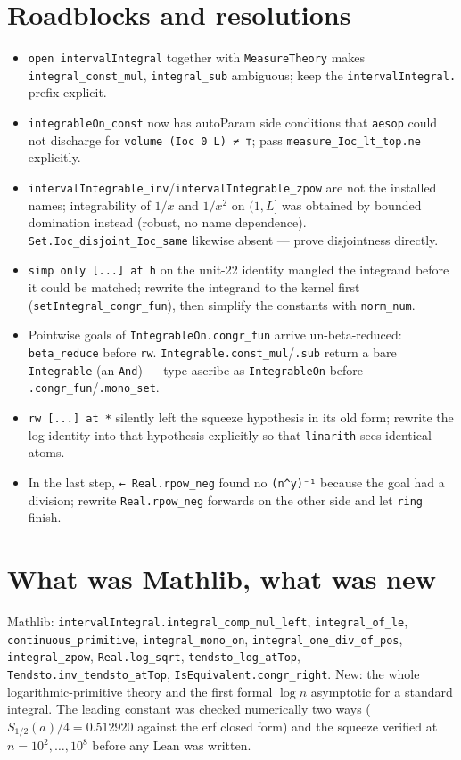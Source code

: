 \documentclass[11pt]{article}
\begin{document}
\section{Roadblocks and resolutions}
\begin{itemize}
\item \texttt{open intervalIntegral} together with \texttt{MeasureTheory} makes
\texttt{integral\_const\_mul}, \texttt{integral\_sub} ambiguous; keep the \texttt{intervalIntegral.}
prefix explicit.
\item \texttt{integrableOn\_const} now has autoParam side conditions that \texttt{aesop} could not
discharge for \texttt{volume (Ioc 0 L) ≠ ⊤}; pass \texttt{measure\_Ioc\_lt\_top.ne} explicitly.
\item \texttt{intervalIntegrable\_inv}/\texttt{intervalIntegrable\_zpow} are not the installed names;
integrability of $1/x$ and $1/x^2$ on $(1,L]$ was obtained by bounded domination instead (robust, no
name dependence). \texttt{Set.Ioc\_disjoint\_Ioc\_same} likewise absent --- prove disjointness directly.
\item \texttt{simp only [...] at h} on the unit-22 identity mangled the integrand before it could be
matched; rewrite the integrand to the kernel first (\texttt{setIntegral\_congr\_fun}), then simplify the
constants with \texttt{norm\_num}.
\item Pointwise goals of \texttt{IntegrableOn.congr\_fun} arrive un-beta-reduced: \texttt{beta\_reduce}
before \texttt{rw}. \texttt{Integrable.const\_mul}/\texttt{.sub} return a bare \texttt{Integrable}
(an \texttt{And}) --- type-ascribe as \texttt{IntegrableOn} before \texttt{.congr\_fun}/\texttt{.mono\_set}.
\item \texttt{rw [...] at *} silently left the squeeze hypothesis in its old form; rewrite the log
identity into that hypothesis explicitly so that \texttt{linarith} sees identical atoms.
\item In the last step, \texttt{← Real.rpow\_neg} found no \texttt{(n\^{}y)⁻¹} because the goal had a
division; rewrite \texttt{Real.rpow\_neg} forwards on the other side and let \texttt{ring} finish.
\end{itemize}

\section{What was Mathlib, what was new}
Mathlib: \texttt{intervalIntegral.integral\_comp\_mul\_left}, \texttt{integral\_of\_le},
\texttt{continuous\_primitive}, \texttt{integral\_mono\_on}, \texttt{integral\_one\_div\_of\_pos},
\texttt{integral\_zpow}, \texttt{Real.log\_sqrt}, \texttt{tendsto\_log\_atTop},
\texttt{Tendsto.inv\_tendsto\_atTop}, \texttt{IsEquivalent.congr\_right}. New: the whole
logarithmic-primitive theory and the first formal $\log n$ asymptotic for a standard integral. The
leading constant was checked numerically two ways ($S_{1/2}(a)/4=0.512920$ against the erf closed form)
and the squeeze verified at $n=10^2,\dots,10^8$ before any Lean was written.
\end{document}
